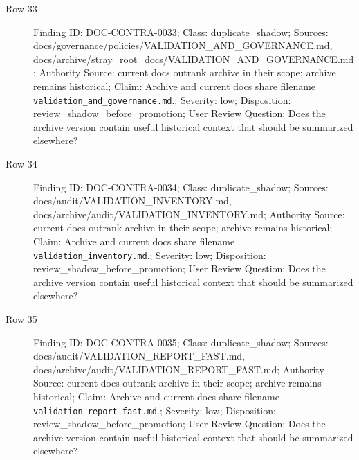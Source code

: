\documentclass[10.5pt,a4paper,openany]{book}
\begin{document}
\begin{description}
\item[Row 33] Finding ID: DOC-\allowbreak{}CONTRA-\allowbreak{}0033; Class: duplicate\_\allowbreak{}shadow; Sources: docs/\allowbreak{}governance/\allowbreak{}policies/\allowbreak{}VALIDATION\_\allowbreak{}AND\_\allowbreak{}GOVERNANCE.\allowbreak{}md, docs/\allowbreak{}archive/\allowbreak{}stray\_\allowbreak{}root\_\allowbreak{}docs/\allowbreak{}VALIDATION\_\allowbreak{}AND\_\allowbreak{}GOVERNANCE.\allowbreak{}md; Authority Source: current docs outrank archive in their scope; archive remains historical; Claim: Archive and current docs share filename \texttt{validation\_\allowbreak{}and\_\allowbreak{}governance.\allowbreak{}md}.\allowbreak{}; Severity: low; Disposition: review\_\allowbreak{}shadow\_\allowbreak{}before\_\allowbreak{}promotion; User Review Question: Does the archive version contain useful historical context that should be summarized elsewhere?
\item[Row 34] Finding ID: DOC-\allowbreak{}CONTRA-\allowbreak{}0034; Class: duplicate\_\allowbreak{}shadow; Sources: docs/\allowbreak{}audit/\allowbreak{}VALIDATION\_\allowbreak{}INVENTORY.\allowbreak{}md, docs/\allowbreak{}archive/\allowbreak{}audit/\allowbreak{}VALIDATION\_\allowbreak{}INVENTORY.\allowbreak{}md; Authority Source: current docs outrank archive in their scope; archive remains historical; Claim: Archive and current docs share filename \texttt{validation\_\allowbreak{}inventory.\allowbreak{}md}.\allowbreak{}; Severity: low; Disposition: review\_\allowbreak{}shadow\_\allowbreak{}before\_\allowbreak{}promotion; User Review Question: Does the archive version contain useful historical context that should be summarized elsewhere?
\item[Row 35] Finding ID: DOC-\allowbreak{}CONTRA-\allowbreak{}0035; Class: duplicate\_\allowbreak{}shadow; Sources: docs/\allowbreak{}audit/\allowbreak{}VALIDATION\_\allowbreak{}REPORT\_\allowbreak{}FAST.\allowbreak{}md, docs/\allowbreak{}archive/\allowbreak{}audit/\allowbreak{}VALIDATION\_\allowbreak{}REPORT\_\allowbreak{}FAST.\allowbreak{}md; Authority Source: current docs outrank archive in their scope; archive remains historical; Claim: Archive and current docs share filename \texttt{validation\_\allowbreak{}report\_\allowbreak{}fast.\allowbreak{}md}.\allowbreak{}; Severity: low; Disposition: review\_\allowbreak{}shadow\_\allowbreak{}before\_\allowbreak{}promotion; User Review Question: Does the archive version contain useful historical context that should be summarized elsewhere?

\end{description}
\end{document}
